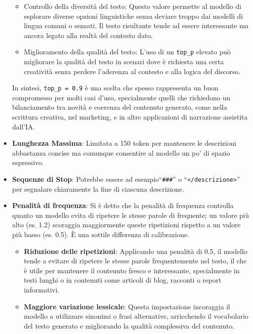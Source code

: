 \begin{itemize}
\begin{itemize}
                \item Controllo della diversità del testo: Questo valore permette al modello di esplorare diverse opzioni linguistiche senza deviare troppo dai modelli di lingua comuni o sensati. Il testo risultante tende ad essere interessante ma ancora legato alla realtà del contesto dato.
                \item Miglioramento della qualità del testo: L'uso di un \texttt{top\_p} elevato può migliorare la qualità del testo in scenari dove è richiesta una certa creatività senza perdere l'aderenza al contesto e alla logica del discorso.
            \end{itemize}
        
            In sintesi, \texttt{top\_p = 0.9} è una scelta che spesso rappresenta un buon compromesso per molti casi d'uso, specialmente quelli che richiedono un bilanciamento tra novità e coerenza del contenuto generato, come nella scrittura creativa, nel marketing, e in altre applicazioni di narrazione assistita dall'IA.
        
        \item
            \textbf{Lunghezza Massima}: Limitata a 150 token per mantenere le descrizioni abbastanza concise ma comunque consentire al modello un po' di spazio espressivo.
        
        \item
            \textbf{Sequenze di Stop}: Potrebbe essere ad esempio``\texttt{\#\#\#}'' o ``\texttt{</descrizione>}'' per segnalare chiaramente la fine di ciascuna descrizione.
        
        \item
            \textbf{Penalità di frequenza}: Si è detto che la penalità di frequenza controlla quanto un modello evita di ripetere le stesse parole di frequente; un valore più alto (es. 1.2) scoraggia maggiormente queste ripetizioni rispetto a un valore più basso (es. 0.5). È una sottile differenza di calibrazione.
            \begin{itemize}
                \item \textbf{Riduzione delle ripetizioni}: Applicando una penalità di 0.5, il modello tende a evitare di ripetere le stesse parole frequentemente nel testo, il che è utile per mantenere il contenuto fresco e interessante, specialmente in testi lunghi o in contenuti come articoli di blog, racconti o report informativi.
                
                \item \textbf{Maggiore variazione lessicale}: Questa impostazione incoraggia il modello a utilizzare sinonimi o frasi alternative, arricchendo il vocabolario del testo generato e migliorando la qualità complessiva del contenuto.
                

\end{itemize}
\end{itemize}
